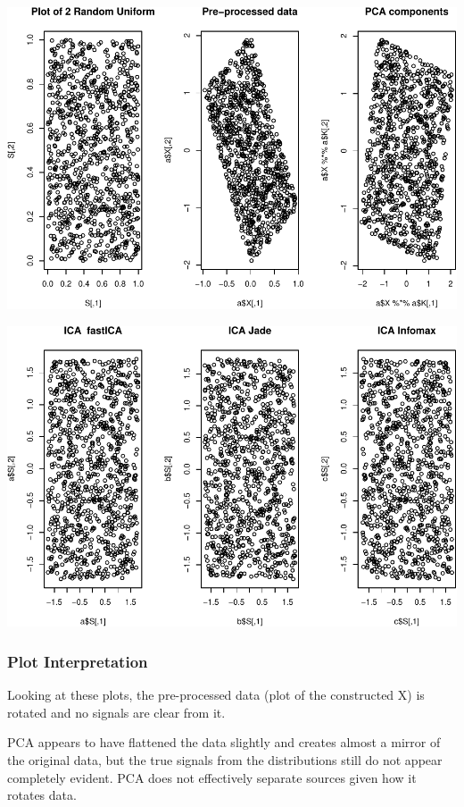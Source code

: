 \documentclass[12pt,twoside]{amherstthesis}
\begin{document}
  \begin{center}\includegraphics{ICAStatsComps_files/figure-latex/unnamed-chunk-3-1} \end{center}
  
  \begin{center}\includegraphics{ICAStatsComps_files/figure-latex/unnamed-chunk-3-2} \end{center}
  
  \subsubsection{Plot Interpretation}\label{plot-interpretation}
  
  Looking at these plots, the pre-processed data (plot of the constructed
  X) is rotated and no signals are clear from it.
  
  PCA appears to have flattened the data slightly and creates almost a
  mirror of the original data, but the true signals from the distributions
  still do not appear completely evident. PCA does not effectively
  separate sources given how it rotates data.
  
\end{document}
